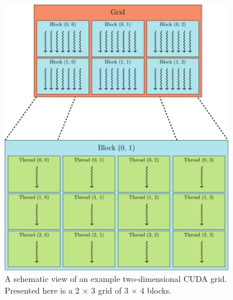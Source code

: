 \begin{figure}[ht]
  \centering
  \includegraphics[width=0.9\textwidth]{figures/cuda_grid}
  \caption{A schematic view of an example two-dimensional CUDA grid. Presented here is a 2
    $\times$ 3 grid of 3 $\times$ 4 blocks.} \label{fig:cuda_grid}
\end{figure}


